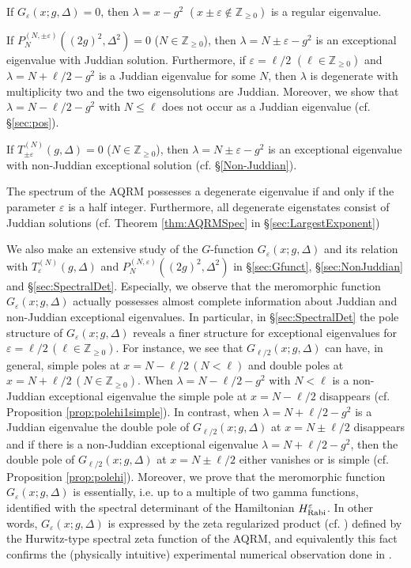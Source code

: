 \documentclass[11pt]{article}
\numberwithin{equation}{section}
\newcommand{\Z}{\mathbb{Z}} %
\newcommand{\e}{\varepsilon}
\newcommand{\HRabi}[1]{H_{\text{\upshape Rabi}}^{#1}} %
\newcommand{\cp}[2]{P^{(#1)}_{#2}} %
\theoremstyle{plain}
\theoremstyle{definition}
\theoremstyle{remark}
\begin{document}
\begin{compactitem}
\item If \(G_\e(x;g,\Delta)= 0\), then \(\lambda = x - g^2\) $(x \pm \e \not \in \Z_{\geq0})$ is a regular eigenvalue.
\item If \( \cp{N,\pm \e}{N}((2g)^2,\Delta^2) = 0 \) ($N\in \Z_{\geq0}$), then \(\lambda = N \pm \e - g^2\) is an exceptional eigenvalue with Juddian solution.
  Furthermore, if \(\e = \ell/2 \) \( (\ell \in \Z_{\geq 0})\) and \(\lambda = N + \ell/2 - g^2\) is a Juddian eigenvalue for some $N$, then  \(\lambda\)
  is degenerate with multiplicity two and the two eigensolutions are Juddian. Moreover, we show that \(\lambda = N - \ell/2 - g^2\) with
  \(N  \leq  \ell \) does not occur as a Juddian eigenvalue (cf. \S \ref{sec:pos}).
\item  If \( T_{\pm\e}^{(N)}(g,\Delta)  = 0 \)  ($N\in \Z_{\geq 0}$), then \(\lambda = N \pm \e - g^2\) is an exceptional eigenvalue with non-Juddian exceptional
  solution (cf. \S \ref{Non-Juddian}).
\item The spectrum of the AQRM possesses a degenerate eigenvalue if and only if the parameter $\e$ is a half integer. Furthermore, all degenerate
  eigenstates consist of Juddian solutions (cf. Theorem \ref{thm:AQRMSpec} in \S \ref{sec:LargestExponent})
\end{compactitem}

We also make an extensive study of the $G$-function $G_\e(x;g,\Delta)$ and its relation with $T_\e^{(N)}(g,\Delta)$ and $\cp{N, \e}{N}((2g)^2,\Delta^2) $ in
\S\ref{sec:Gfunct}, \S\ref{sec:NonJuddian} and \S\ref{sec:SpectralDet}. Especially, we observe that the meromorphic function $G_\e(x;g,\Delta)$
actually possesses almost complete information about Juddian and non-Juddian exceptional eigenvalues. In particular, in \S\ref{sec:SpectralDet} the pole
structure of $G_\e(x;g,\Delta)$ reveals a finer structure for exceptional eigenvalues for $\e=\ell/2\,(\ell\in \Z_{\geq 0})$. For instance, we see that
$G_{\ell/2}(x;g,\Delta)$ can have, in general, simple poles at \( x = N - \ell/2 \, (N  < \ell )\) and double poles at \( x = N + \ell/2 \, ( N \in \Z_{\geq 0})\).
When \(\lambda = N - \ell/2-g^2\) with \(N  < \ell \) is a non-Juddian exceptional eigenvalue the simple pole at \( x = N - \ell/2 \) disappears (cf. Proposition
\ref{prop:polehi1simple}). In contrast, when \(\lambda = N + \ell/2 - g^2 \) is a Juddian eigenvalue the double pole of $G_{\ell/2}(x;g,\Delta)$ at $x=N\pm\ell/2$
disappears and if there is a non-Juddian exceptional eigenvalue \(\lambda = N + \ell/2 - g^2 \), then the double pole of $G_{\ell/2}(x;g,\Delta)$ at $x=N\pm\ell/2$
either vanishes or is simple (cf. Proposition \ref{prop:polehi}).
Moreover, we prove that the meromorphic function $G_\e(x;g,\Delta)$ is essentially, i.e. up to a multiple of two gamma functions, identified with the
spectral determinant of the Hamiltonian $\HRabi{\e}$. In other words, $G_\e(x;g,\Delta)$ is expressed by the zeta regularized product
(cf. \cite{QHS1993TAMS}) defined by the Hurwitz-type spectral zeta function of the AQRM, and equivalently this fact confirms the (physically
intuitive) experimental numerical observation done in \cite{LB2016JPA}.
\end{document}

